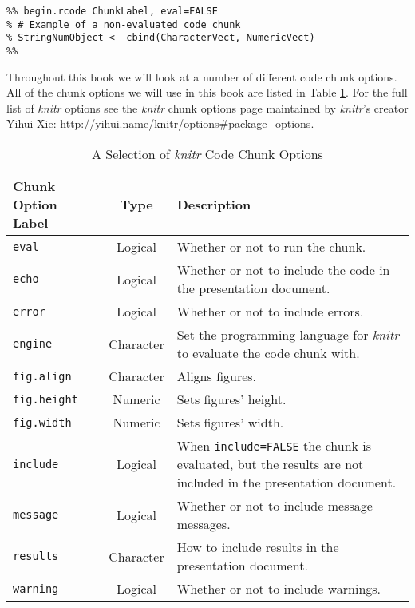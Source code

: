 \begin{knitrout}
    \color{fgcolor}
    \begin{kframe}
        \begin{verbatim}
%% begin.rcode ChunkLabel, eval=FALSE
% # Example of a non-evaluated code chunk
% StringNumObject <- cbind(CharacterVect, NumericVect)
%%
            \end{verbatim}
        \end{kframe}
\end{knitrout}

Throughout this book we will look at a number of different code chunk options. All of the chunk options we will use in this book are listed in Table \ref{ChunkOptionsTable}. For the full list of {\emph{knitr}} options see the {\emph{knitr}} chunk options page maintained by {\emph{knitr}}'s creator Yihui Xie: \url{http://yihui.name/knitr/options#package_options}. 


\begin{table}
  \caption{A Selection of {\emph{knitr}} Code Chunk Options}
  \begin{center}
  \label{ChunkOptionsTable}
  \begin{tabular}{l c p{5cm}}
    \hline  
    Chunk Option Label & Type & Description \\[0.25cm] \hline\hline
    \texttt{eval} & Logical & Whether or not to run the chunk. \\[0.25cm]
    \texttt{echo} & Logical & Whether or not to include the code in the presentation document. \\[0.25cm]
    \texttt{error} & Logical & Whether or not to include errors. \\[0.25cm]
    \texttt{engine} & Character & Set the programming language for {\emph{knitr}} to evaluate the code chunk with. \\[0.25cm]
    \texttt{fig.align} & Character & Aligns figures. \\[0.25cm]
    \texttt{fig.height} & Numeric & Sets figures' height. \\[0.25cm]
    \texttt{fig.width} & Numeric & Sets figures' width. \\[0.25cm]
    \texttt{include} & Logical & When \texttt{include=FALSE} the chunk is evaluated, but the results are not included in the presentation document. \\[0.25cm]
    \texttt{message} & Logical & Whether or not to include message messages. \\[0.25cm]
    \texttt{results} & Character & How to include results in the presentation document. \\[0.25cm]
    \texttt{warning} & Logical & Whether or not to include warnings. \\[0.25cm]
    \hline
  \end{tabular}
  \end{center}
\end{table}

